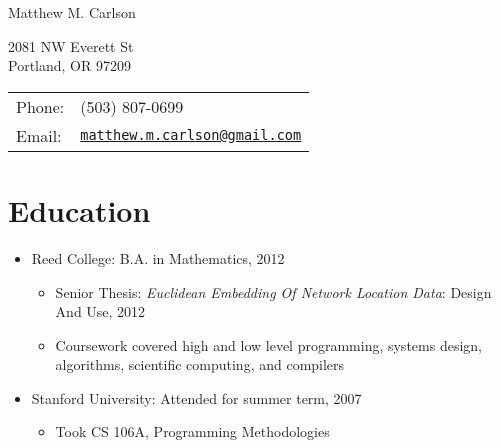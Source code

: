 \documentclass[letterpaper]{article}
\def\name{Matthew M. Carlson}%
\begin{document}
{\huge \name}%
\vspace{0.25in}

\begin{minipage}{0.45\linewidth}
	2081 NW Everett St \\
	Portland, OR 97209
\end{minipage}
\begin{minipage}{0.45\linewidth}
	\begin{tabular}{ll}
	Phone: & (503) 807-0699 \\
	Email: & \href{mailto:matthew.m.carlson@gmail.com}{\tt matthew.m.carlson@gmail.com} \\
  \end{tabular}
\end{minipage}





\section*{Education}

\begin{itemize}
  \item Reed College: B.A. in Mathematics, 2012
	\begin{itemize}
        \item Senior Thesis: \textit{Euclidean Embedding Of Network Location Data}: Design And Use, 2012
        \item Coursework covered high and low level programming, systems design, algorithms, scientific computing, and compilers 
	\end{itemize}
  \item Stanford University: Attended for summer term, 2007
  \begin{itemize}
        \item Took CS 106A, Programming Methodologies
  \end{itemize}
\end{itemize}
\end{document}
